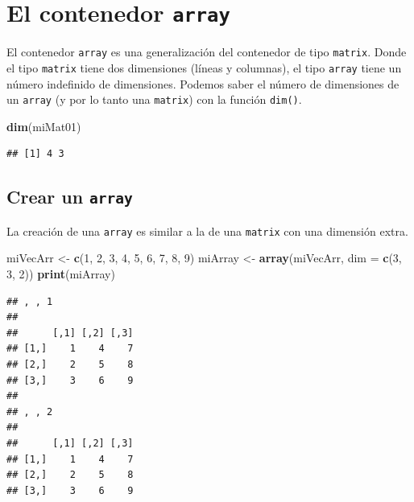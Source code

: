 \documentclass[]{book}
\newenvironment{Shaded}{\begin{snugshade}}{\end{snugshade}}
\newcommand{\KeywordTok}[1]{\textcolor[rgb]{0.13,0.29,0.53}{\textbf{#1}}}
\newcommand{\DataTypeTok}[1]{\textcolor[rgb]{0.13,0.29,0.53}{#1}}
\newcommand{\DecValTok}[1]{\textcolor[rgb]{0.00,0.00,0.81}{#1}}
\newcommand{\StringTok}[1]{\textcolor[rgb]{0.31,0.60,0.02}{#1}}
\newcommand{\NormalTok}[1]{#1}
\begin{document}
\section{\texorpdfstring{El contenedor
\texttt{array}}{El contenedor array}}\label{el-contenedor-array}

El contenedor \texttt{array} es una generalización del contenedor de
tipo \texttt{matrix}. Donde el tipo \texttt{matrix} tiene dos
dimensiones (líneas y columnas), el tipo \texttt{array} tiene un número
indefinido de dimensiones. Podemos saber el número de dimensiones de un
\texttt{array} (y por lo tanto una \texttt{matrix}) con la función
\texttt{dim()}.

\begin{Shaded}
\begin{Highlighting}[]
\KeywordTok{dim}\NormalTok{(miMat01)}
\end{Highlighting}
\end{Shaded}

\begin{verbatim}
## [1] 4 3
\end{verbatim}

\subsection{\texorpdfstring{Crear un
\texttt{array}}{Crear un array}}\label{crear-un-array}

La creación de una \texttt{array} es similar a la de una \texttt{matrix}
con una dimensión extra.

\begin{Shaded}
\begin{Highlighting}[]
\NormalTok{miVecArr <-}\StringTok{ }\KeywordTok{c}\NormalTok{(}\DecValTok{1}\NormalTok{, }\DecValTok{2}\NormalTok{, }\DecValTok{3}\NormalTok{, }\DecValTok{4}\NormalTok{, }\DecValTok{5}\NormalTok{, }\DecValTok{6}\NormalTok{, }\DecValTok{7}\NormalTok{, }\DecValTok{8}\NormalTok{, }\DecValTok{9}\NormalTok{)}
\NormalTok{miArray <-}\StringTok{ }\KeywordTok{array}\NormalTok{(miVecArr, }\DataTypeTok{dim =} \KeywordTok{c}\NormalTok{(}\DecValTok{3}\NormalTok{, }\DecValTok{3}\NormalTok{, }\DecValTok{2}\NormalTok{))}
\KeywordTok{print}\NormalTok{(miArray)}
\end{Highlighting}
\end{Shaded}

\begin{verbatim}
## , , 1
## 
##      [,1] [,2] [,3]
## [1,]    1    4    7
## [2,]    2    5    8
## [3,]    3    6    9
## 
## , , 2
## 
##      [,1] [,2] [,3]
## [1,]    1    4    7
## [2,]    2    5    8
## [3,]    3    6    9
\end{verbatim}
\end{document}
